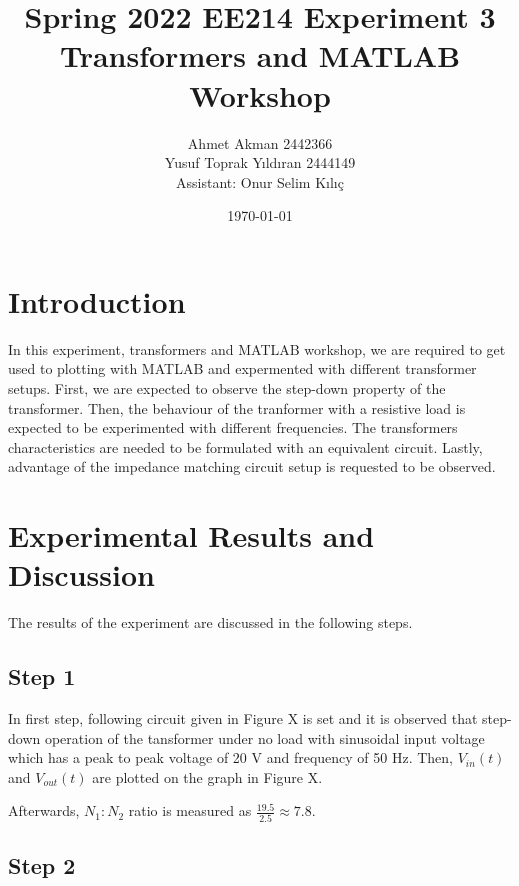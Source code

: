 \documentclass[letterpaper,12pt]{article}
\begin{document}
\thispagestyle{empty}

\title{Spring 2022 EE214 Experiment 3  \protect\\ Transformers and MATLAB Workshop }
\author{Ahmet Akman 2442366 \protect\\ Yusuf Toprak Yıldıran 2444149 \protect\\ Assistant: Onur Selim Kılıç}
\date{\today}
\maketitle
\tableofcontents
\section{Introduction}
In this experiment, transformers and MATLAB workshop, we are required to get used to plotting with MATLAB and expermented with different transformer setups. First, we are expected to observe the step-down property of the transformer. Then, the behaviour of the tranformer with a resistive load is expected to be experimented with different frequencies. The transformers characteristics are needed to be formulated with an equivalent circuit. Lastly, advantage of the impedance matching circuit setup is requested to be observed.
\section{Experimental Results and Discussion}
The results of the experiment are discussed in the following steps.
%
\subsection{Step 1}


In first step, following circuit given in Figure X is set and it is observed that step-down operation of the tansformer under no load with sinusoidal input voltage which has a peak to peak voltage of 20 V and frequency of 50 Hz. Then, \(V_{in}(t) \) and \(V_{out}(t)\) are plotted on the graph in Figure X.

Afterwards, \(N_1:N_2\) ratio is measured as \(\frac{19.5}{2.5}\approx 7.8 \).

%
\subsection{Step 2}
\end{document}
